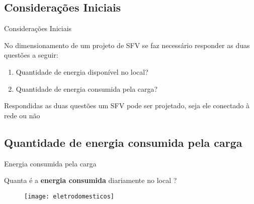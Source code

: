 
\subsection{Considerações Iniciais}

\begin{frame}{Considerações Iniciais}

No dimensionamento de um projeto de SFV se faz necessário responder as duas questões a seguir:

\vspace{.5cm}

\begin{enumerate}
\item Quantidade de energia disponível no local?
\item Quantidade de energia consumida pela carga?
\end{enumerate}

\vspace{.5cm}

\begin{exampleblock}{}
\begin{center}
Respondidas as duas questões um SFV pode ser projetado, seja ele conectado à rede ou não
\end{center} 
\end{exampleblock}

\end{frame}

\subsection{Quantidade de energia consumida pela carga}

\begin{frame}{Energia consumida pela carga}

Quanta é a \textbf{energia consumida} diariamente no local ? 

\begin{figure}[H]
	\texttt{[image: eletrodomesticos]}
\end{figure}

\end{frame}

